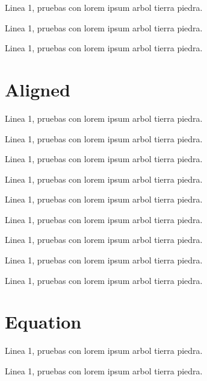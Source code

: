 Linea 1, pruebas con lorem ipsum arbol tierra piedra.

\insertaligncaptioned[\label{align3}]{arg2}{}

Linea 1, pruebas con lorem ipsum arbol tierra piedra.


Linea 1, pruebas con lorem ipsum arbol tierra piedra.

\newpage
\section{Aligned}
Linea 1, pruebas con lorem ipsum arbol tierra piedra.


Linea 1, pruebas con lorem ipsum arbol tierra piedra.


Linea 1, pruebas con lorem ipsum arbol tierra piedra.

\insertaligned[\label{aligned1}]{arg2}

Linea 1, pruebas con lorem ipsum arbol tierra piedra.


Linea 1, pruebas con lorem ipsum arbol tierra piedra.


Linea 1, pruebas con lorem ipsum arbol tierra piedra.


Linea 1, pruebas con lorem ipsum arbol tierra piedra.

\insertalignedcaptioned[\label{aligned3}]{arg2}{}

Linea 1, pruebas con lorem ipsum arbol tierra piedra.


Linea 1, pruebas con lorem ipsum arbol tierra piedra.

\newpage
\section{Equation}
Linea 1, pruebas con lorem ipsum arbol tierra piedra.


Linea 1, pruebas con lorem ipsum arbol tierra piedra.


